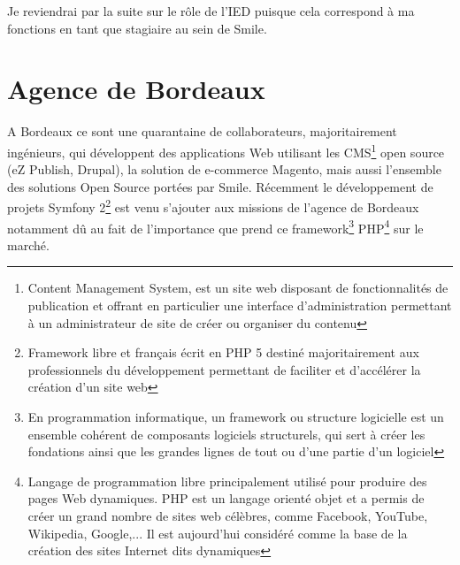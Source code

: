\documentclass[a4paper,11pt,twoside]{report}
\begin{document}
  Je reviendrai par la suite sur le rôle de l'IED puisque cela correspond à ma fonctions en tant que stagiaire au sein de Smile.
  
  \section{Agence de Bordeaux}
  A Bordeaux ce sont une quarantaine de collaborateurs, majoritairement ingénieurs, qui développent des applications Web utilisant les CMS\footnote{Content Management System, est un site web disposant de fonctionnalités de publication et offrant en particulier une interface d'administration permettant à un administrateur de site de créer ou organiser du contenu} open source (eZ Publish, Drupal), la solution de e-commerce Magento, mais aussi l’ensemble des solutions Open Source portées par Smile. Récemment le développement de projets Symfony 2\footnote{Framework libre et français écrit en PHP 5 destiné majoritairement aux professionnels du développement permettant de faciliter et d’accélérer la création d'un site web} est venu s'ajouter aux missions de l'agence de Bordeaux notamment dû au fait de l'importance que prend ce framework\footnote{En programmation informatique, un framework ou structure logicielle est un ensemble cohérent de composants logiciels structurels, qui sert à créer les fondations ainsi que les grandes lignes de tout ou d’une partie d'un logiciel} PHP\footnote{Langage de programmation libre principalement utilisé pour produire des pages Web dynamiques. PHP est un langage orienté objet et a permis de créer un grand nombre de sites web célèbres, comme Facebook, YouTube, Wikipedia, Google,... Il est aujourd'hui considéré comme la base de la création des sites Internet dits dynamiques} sur le marché.\newline
\end{document}
